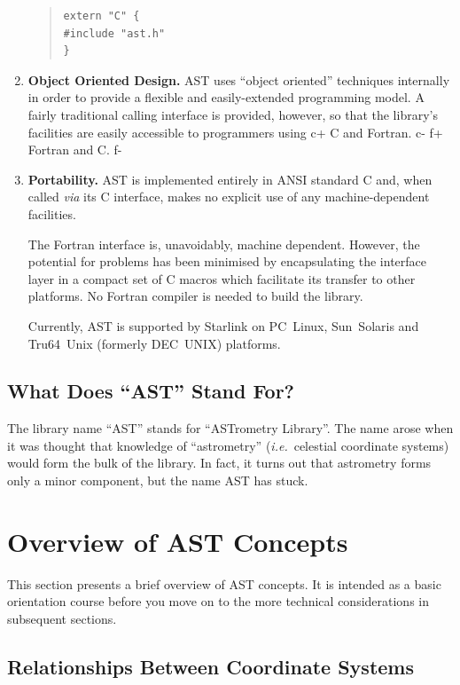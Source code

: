 \documentclass[twoside,11pt]{article}
\begin{document}
\begin{enumerate}
\begin{quote}
\small
\begin{verbatim}
extern "C" {
#include "ast.h"
}
\end{verbatim}
\normalsize
\end{quote}

\item {\bf{Object Oriented Design.}}
AST uses ``object oriented'' techniques internally in order to provide
a flexible and easily-extended programming model.  A fairly
traditional calling interface is provided, however, so that the
library's facilities are easily accessible to programmers using
c+
C and Fortran.
c-
f+
Fortran and C.
f-

\item {\bf{Portability.}}
AST is implemented entirely in ANSI standard C and, when called
{\em{via}} its C interface, makes no explicit use of any
machine-dependent facilities.

The Fortran interface is, unavoidably, machine dependent. However, the
potential for problems has been minimised by encapsulating the
interface layer in a compact set of C macros which facilitate its
transfer to other platforms. No Fortran compiler is needed to build
the library.

Currently, AST is supported by Starlink on PC~Linux, Sun~Solaris and
Tru64~Unix (formerly DEC~UNIX) platforms.
\end{enumerate}

\subsection{What Does ``AST'' Stand For?}

The library name ``AST'' stands for ``ASTrometry Library''. The name
arose when it was thought that knowledge of ``astrometry''
({\em{i.e.}}\ celestial coordinate systems) would form the bulk of the
library.  In fact, it turns out that astrometry forms only a minor
component, but the name AST has stuck.

\cleardoublepage
\section{Overview of AST Concepts}

This section presents a brief overview of AST concepts. It is intended
as a basic orientation course before you move on to the more technical
considerations in subsequent sections.

\subsection{\label{ss:mappingoverview}Relationships Between Coordinate Systems}
\end{document}
